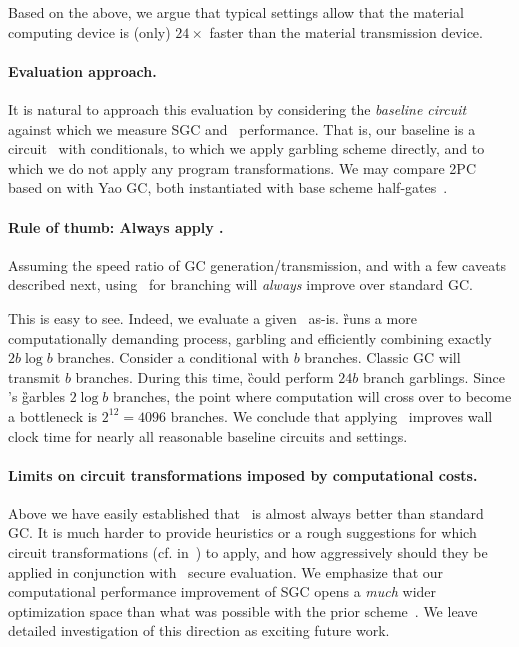 Based on the above, we argue that typical settings allow that the
material computing device is (only) $24\times$ faster than the material transmission
device.




\paragraph{Evaluation approach.}  It is natural to approach this
evaluation by considering the {\em baseline circuit} against which we
measure SGC and \ourschemelong\ performance.    That is, our baseline is a
circuit \cir\ with conditionals, to which we apply garbling scheme
directly, and to which we do not apply any program transformations.
We may compare 2PC based on \ourschemelong with  Yao GC, both instantiated
with base scheme half-gates~\cite{EC:ZahRosEva15}.



\paragraph{Rule of thumb: Always apply \ourscheme.}  Assuming the
speed ratio of GC generation/transmission, and with a few caveats
described next, using \ourschemelong\ for branching will {\em always}
improve over standard GC. 

This is easy to see.  Indeed, we evaluate a given \cir\ as-is.  \G
runs a more computationally demanding  process, garbling and
efficiently combining exactly $2 b \log b$ branches.  Consider a
conditional with $b$ branches.  Classic GC will transmit $b$ branches.
During this time, \G could perform $24 b$ branch garblings. Since
\ourschemelong's \G garbles $2\log b$ branches, the point where
computation will cross over to become a bottleneck is $2^{12} = 4096$
branches.  We conclude that applying \ourschemelong\ improves wall clock
time for nearly all reasonable baseline circuits and settings.


\paragraph{Limits on circuit transformations imposed by computational costs.}
Above we have easily  established that \ourschemelong\ is almost always
better than standard GC.   It is much harder to provide heuristics or
a rough suggestions for which circuit transformations (cf.
in~) to apply, and how aggressively should
they be applied in conjunction with \ourschemelong\ secure evaluation.  We
emphasize that our computational performance improvement of SGC opens
a {\em much} wider optimization space than what was possible with the
prior scheme~\HK.  We leave detailed investigation of this direction
as exciting future work.





